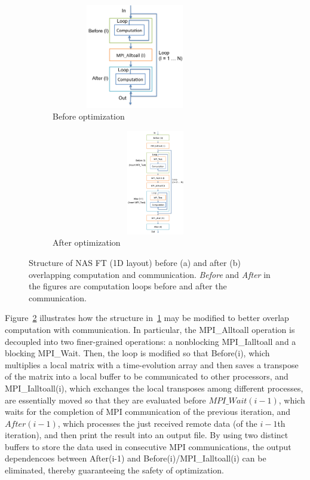 \begin{figure}
  \centering
  \begin{subfigure}[b]{0.2\textwidth}
    \includegraphics[width=0.8\textwidth,height=1.8in]{fig/ft_loop.png}
    \caption{Before optimization}
    \label{fig:ft_loop}
  \end{subfigure}%
  \hspace{-.3in}
  \begin{subfigure}[b]{0.3\textwidth}
    \includegraphics[width=1.1\textwidth,height=1.8in]{fig/ft_cco.png}
    \caption{After optimization}
    \label{fig:ft_cco}
  \end{subfigure}
  \caption{Structure of NAS FT (1D layout) before (a) and after (b)
    overlapping computation and communication.  \emph{Before} and
    \emph{After} in the figures are computation loops before and after
    the communication.}
\label{fig:ft}
\end{figure}

Figure~\ref{fig:ft_cco} illustrates how the structure
in~\ref{fig:ft_loop} may be modified to better overlap computation
with communication.  In particular, the MPI\_Alltoall operation is
decoupled into two finer-grained operations: a nonblocking
MPI\_Ialltoall and a blocking MPI\_Wait.  Then, the loop is modified
so that Before(i), which multiplies a local matrix with a
time-evolution array and then saves a transpose of the matrix into a
local buffer to be communicated to other processors, and
MPI\_Ialltoall(i), which exchanges the local transposes among different
processes, are essentially moved so that they are evaluated before
$MPI\_Wait(i-1)$, which waits for the completion of MPI communication
of the previous iteration, and $After(i-1)$, which processes the just
received remote data (of the $i-1$th iteration), and then print the
result into an output file.  By using two distinct buffers to store
the data used in consecutive MPI communications, the output
dependencoes between After(i-1) and Before(i)/MPI\_Ialltoall(i) can be
eliminated, thereby guaranteeing the safety of optimization.

